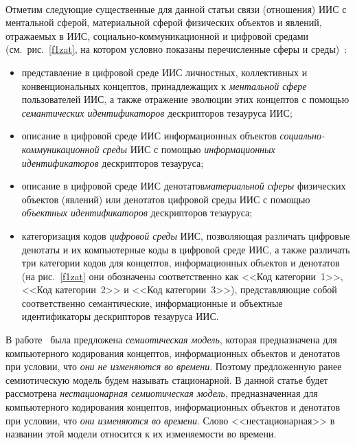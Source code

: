 \begin{multicols}{2}
\begin{figure*} %
\begin{center}
\vspace*{1pt}
\mbox{%
\epsfxsize=153.251mm
}
\end{center}
\vspace*{-3pt}
   \vspace*{6pt}
   \end{figure*}
   
   Отметим следующие существенные для данной статьи связи (отношения) ИИС с 
ментальной сферой, материальной сферой физических объектов и явлений, отражаемых в 
ИИС, социально-ком\-му\-ни\-ка\-ци\-он\-ной и цифровой средами (см.\ рис.~\ref{f1zat}, на котором 
условно показаны перечисленные сферы и среды)~\cite{2zat, 7zat}:
   \begin{itemize}
\item представление в цифровой среде ИИС личностных, коллективных и конвенциональных 
концептов, принадлежащих к \textit{ментальной сфере} пользователей ИИС, а также 
отражение эволюции этих концептов с помощью \textit{семантических идентификаторов} 
дескрипторов тезауруса ИИС;
\item описание в цифровой среде ИИС информационных объектов 
\textit{со\-ци\-аль\-но-ком\-му\-ни\-ка\-ци\-он\-ной среды} ИИС с помощью 
\textit{информационных идентификаторов} дескрипторов тезауруса;
\item описание в цифровой среде ИИС денотатов\linebreak \textit{материальной сферы} 
физических объектов (явлений) или денотатов цифровой среды ИИС с помощью 
\textit{объектных идентификаторов} дескрипторов тезауруса;
\item категоризация кодов \textit{цифровой среды} ИИС, позволяющая различать 
цифровые денотаты и их компьютерные коды в цифровой среде ИИС, а также 
различать три категории кодов для концептов, информационных объектов и 
денотатов (на рис.~\ref{f1zat} они обозначены соответственно как <<Код 
категории~1>>, <<Код категории~2>> и <<Код категории~3>>), представляющие собой 
соответственно семантические, информационные и объектные идентификаторы 
дескрипторов тезауруса ИИС.
\end{itemize}
   
   
   В работе~\cite{2zat}  была предложена \textit{семиотическая модель}, которая 
предназначена для компьютерного кодирования концептов, информационных объектов и 
денотатов при условии, что \textit{они не изменяются во времени}. Поэтому предложенную 
ранее семиотическую модель будем называть стационарной. В данной статье будет 
рассмотрена \textit{нестационарная семиотическая модель}, предназначенная для 
компьютерного кодирования концептов, информационных объектов и денотатов при 
условии, что \textit{они изменяются во времени}. Слово <<нестационарная>> в названии 
этой модели относится к их изменяемости во времени.
   

\end{multicols}
